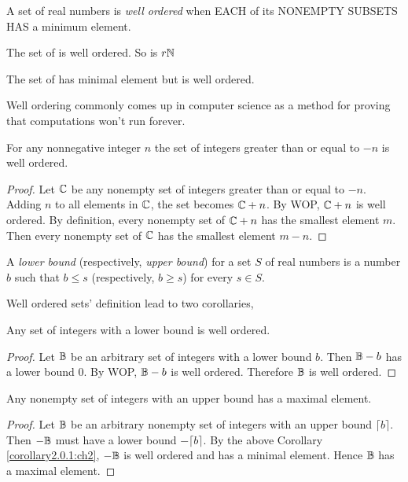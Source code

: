 \begin{definition}
    A set of real numbers is \textit{well ordered} when EACH of its NONEMPTY SUBSETS
    HAS a minimum element.
\end{definition}

\begin{ab}
    The set of  is well ordered. So is $r\mathbb{N}$

    The set of  has minimal element but is 
    well ordered.
\end{ab}

\begin{ab}
    Well ordering commonly comes up in computer science as a method for proving
    that computations won't run forever.
\end{ab}

\begin{claim}
    For any nonnegative integer $n$ the set of integers greater than or
    equal to $-n$ is well ordered.
\end{claim}

\begin{proof}
    Let $\mathbb{C}$ be any nonempty set of integers greater than or equal to $-n$.
    Adding $n$ to all elements in $\mathbb{C}$, the set becomes $\mathbb{C} + n$. By WOP,
    $\mathbb{C} + n$ is well ordered. By definition, every nonempty set of $\mathbb{C} + n$
    has the smallest element $m$. Then every nonempty set of $\mathbb{C}$ has
    the smallest element $m - n$.
\end{proof}

\begin{definition}
    A \textit{lower bound} (respectively, \textit{upper bound}) for a set $S$ of real
    numbers is a number $b$ such that $b \leq s$ (respectively, $b \geq s$) for every $s \in S$.
\end{definition}

Well ordered sets' definition lead to two corollaries,

\begin{cor} \label{corollary2.0.1:ch2}
    Any set of integers with a lower bound is well ordered.
\end{cor}

\begin{proof}
    Let $\mathbb{B}$ be an arbitrary set of integers with a lower bound $b$. Then
    $\mathbb{B} - b$ has a lower bound $0$. By WOP, $\mathbb{B} - b$ is well ordered.
    Therefore $\mathbb{B}$ is well ordered.
\end{proof}

\begin{cor}
    Any nonempty set of integers with an upper bound has a maximal element.
\end{cor}

\begin{proof} \label{corollary2.0.2:ch2}
    Let $\mathbb{B}$ be an arbitrary nonempty set of integers with an upper
    bound $\lceil b \rceil$. Then $-\mathbb{B}$ must have a lower bound $-\lceil b \rceil$.
    By the above Corollary \ref{corollary2.0.1:ch2}, $-\mathbb{B}$ is well ordered and has
    a minimal element. Hence $\mathbb{B}$ has a maximal element.
\end{proof}
